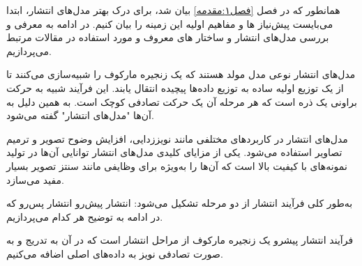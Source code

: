 
\label{فصل۲:مفاهیم اولیه}
همانطور که در فصل \ref{فصل۱:مقدمه} بیان شد، برای درک بهتر مدل‌های انتشار، ابتدا می‌بایست پیش‌نیاز ها و مفاهیم اولیه این زمینه را بیان کنیم. در ادامه به معرفی و بررسی مدل‌های انتشار و ساختار های معروف و مورد استفاده در مقالات مرتبط می‌پردازیم.






مدل‌های انتشار نوعی مدل مولد هستند که یک زنجیره مارکوف را شبیه‌سازی می‌کنند تا از یک توزیع اولیه ساده به توزیع داده‌ها پیچیده انتقال یابند. این فرآیند شبیه به حرکت براونی یک ذره است که هر مرحله آن یک حرکت تصادفی کوچک است. به همین دلیل به آن‌ها "مدل‌های انتشار" گفته می‌شود.

مدل‌های انتشار در کاربردهای مختلفی مانند نویززدایی، افزایش وضوح تصویر و ترمیم تصاویر استفاده می‌شود. یکی از مزایای کلیدی مدل‌های انتشار توانایی آن‌ها در تولید نمونه‌های با کیفیت بالا است که آن‌ها را به‌ویژه برای وظایفی مانند سنتز تصویر بسیار مفید می‌سازد.

به‌طور کلی فرآیند انتشار از دو مرحله تشکیل می‌شود:
 انتشار پیش‌رو
 انتشار پس‌رو
که در ادامه به توضیح هر کدام می‌پردازیم.

























































فرآیند انتشار پیشرو یک زنجیره مارکوف از مراحل انتشار است که در آن به تدریج و به صورت تصادفی نویز به داده‌های اصلی اضافه می‌کنیم.

